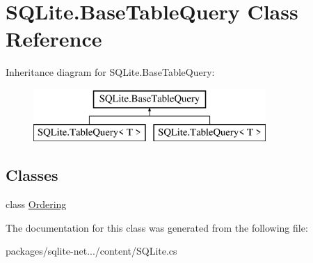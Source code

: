 \hypertarget{classSQLite_1_1BaseTableQuery}{\section{S\-Q\-Lite.\-Base\-Table\-Query Class Reference}
\label{classSQLite_1_1BaseTableQuery}
}
Inheritance diagram for S\-Q\-Lite.\-Base\-Table\-Query\-:\begin{figure}[H]
\begin{center}
\leavevmode
\includegraphics[height=2.000000cm]{classSQLite_1_1BaseTableQuery}
\end{center}
\end{figure}
\subsection*{Classes}
\begin{DoxyCompactItemize}
\item 
class \hyperlink{classSQLite_1_1BaseTableQuery_1_1Ordering}{Ordering}
\end{DoxyCompactItemize}


The documentation for this class was generated from the following file\-:\begin{DoxyCompactItemize}
\item 
packages/sqlite-\/net.../content/S\-Q\-Lite.\-cs\end{DoxyCompactItemize}
